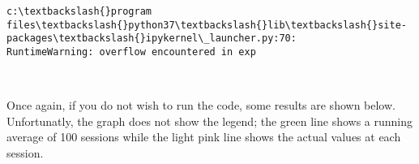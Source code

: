\documentclass[11pt]{article}
\begin{document}
    \begin{Verbatim}[commandchars=\\\{\}]
c:\textbackslash{}program files\textbackslash{}python37\textbackslash{}lib\textbackslash{}site-packages\textbackslash{}ipykernel\_launcher.py:70:
RuntimeWarning: overflow encountered in exp
\end{Verbatim}

    \begin{center}
    \end{center}
    { \hspace*{\fill} \\}
    
    Once again, if you do not wish to run the code, some results are shown
below. Unfortunatly, the graph does not show the legend; the green line
shows a running average of 100 sessions while the light pink line shows
the actual values at each session.


    
    
    
    
\end{document}
